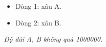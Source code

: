 \begin{itemize}
	\item Dòng 1: xâu A.
	\item Dòng 2: xâu B.
\end{itemize}

\emph{Độ dài A, B không quá 1000000. }

\